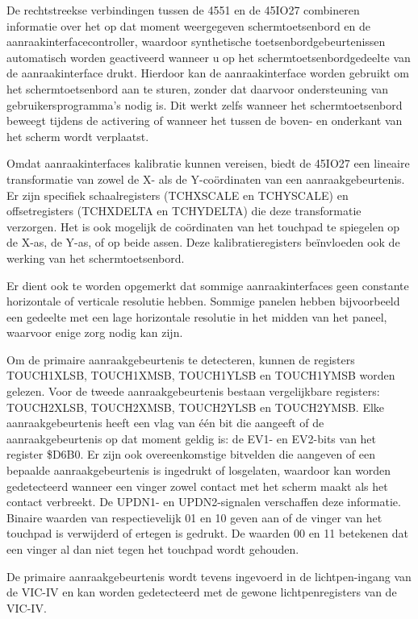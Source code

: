 De rechtstreekse verbindingen tussen de 4551 en de 45IO27 combineren informatie over het op dat moment weergegeven schermtoetsenbord en de aanraakinterfacecontroller, waardoor synthetische toetsenbordgebeurtenissen automatisch worden geactiveerd wanneer u op het schermtoetsenbordgedeelte van de aanraakinterface drukt. Hierdoor kan de aanraakinterface worden gebruikt om het schermtoetsenbord aan te sturen, zonder dat daarvoor ondersteuning van gebruikersprogramma's nodig is. Dit werkt zelfs wanneer het schermtoetsenbord beweegt tijdens de activering of wanneer het tussen de boven- en onderkant van het scherm wordt verplaatst.

Omdat aanraakinterfaces kalibratie kunnen vereisen, biedt de 45IO27 een lineaire transformatie van zowel de X- als de Y-coördinaten van een aanraakgebeurtenis. Er zijn specifiek schaalregisters (TCHXSCALE en TCHYSCALE) en offsetregisters (TCHXDELTA en TCHYDELTA) die deze transformatie verzorgen. Het is ook mogelijk de coördinaten van het touchpad te spiegelen op de X-as, de Y-as, of op beide assen. Deze kalibratieregisters beïnvloeden ook de werking van het schermtoetsenbord.

Er dient ook te worden opgemerkt dat sommige aanraakinterfaces geen constante horizontale of verticale resolutie hebben. Sommige panelen hebben bijvoorbeeld een gedeelte met een lage horizontale resolutie in het midden van het paneel, waarvoor enige zorg nodig kan zijn.

Om de primaire aanraakgebeurtenis te detecteren, kunnen de registers TOUCH1XLSB, TOUCH1XMSB, TOUCH1YLSB en TOUCH1YMSB worden gelezen. Voor de tweede aanraakgebeurtenis bestaan vergelijkbare registers: TOUCH2XLSB, TOUCH2XMSB, TOUCH2YLSB en TOUCH2YMSB. Elke aanraakgebeurtenis heeft een vlag van één bit die aangeeft of de aanraakgebeurtenis op dat moment geldig is: de EV1- en EV2-bits van het register \$D6B0. Er zijn ook overeenkomstige bitvelden die aangeven of een bepaalde aanraakgebeurtenis is ingedrukt of losgelaten, waardoor kan worden gedetecteerd wanneer een vinger zowel contact met het scherm maakt als het contact verbreekt. De UPDN1- en UPDN2-signalen verschaffen deze informatie. Binaire waarden van respectievelijk 01 en 10 geven aan of de vinger van het touchpad is verwijderd of ertegen is gedrukt. De waarden 00 en 11 betekenen dat een vinger al dan niet tegen het touchpad wordt gehouden.

De primaire aanraakgebeurtenis wordt tevens ingevoerd in de lichtpen-ingang van de VIC-IV en kan worden gedetecteerd met de gewone lichtpenregisters van de VIC-IV.

